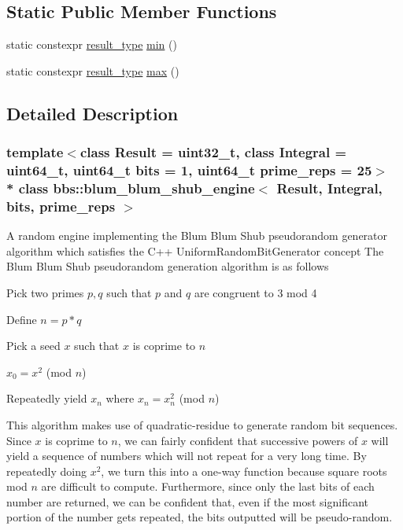 \subsection*{Static Public Member Functions}
\begin{DoxyCompactItemize}
\item 
static constexpr \hyperlink{classbbs_1_1blum__blum__shub__engine_af8f60205a8a8b5cee055ed54d5739805}{result\+\_\+type} \hyperlink{classbbs_1_1blum__blum__shub__engine_a4c76e93e841646e0f57919b7e6d759f4}{min} ()
\item 
static constexpr \hyperlink{classbbs_1_1blum__blum__shub__engine_af8f60205a8a8b5cee055ed54d5739805}{result\+\_\+type} \hyperlink{classbbs_1_1blum__blum__shub__engine_ab150bc100f30d32a7b64ca0834eaa0d9}{max} ()
\end{DoxyCompactItemize}


\subsection{Detailed Description}
\subsubsection*{template$<$class Result = uint32\+\_\+t, class Integral = uint64\+\_\+t, uint64\+\_\+t bits = 1, uint64\+\_\+t prime\+\_\+reps = 25$>$\\*
class bbs\+::blum\+\_\+blum\+\_\+shub\+\_\+engine$<$ Result, Integral, bits, prime\+\_\+reps $>$}

A random engine implementing the Blum Blum Shub pseudorandom generator algorithm which satisfies the C++ Uniform\+Random\+Bit\+Generator concept The Blum Blum Shub pseudorandom generation algorithm is as follows
\begin{DoxyEnumerate}
\item Pick two primes $ p, q $ such that $ p $ and $ q $ are congruent to 3 mod 4
\item Define $ n = p * q $
\item Pick a seed $ x $ such that $ x $ is coprime to $ n $
\item $ x_0 = x^2$ (mod $ n $)
\item Repeatedly yield $ x_n $ where $ x_n = x_n^2 $ (mod $ n $) 
\end{DoxyEnumerate}

This algorithm makes use of quadratic-\/residue to generate random bit sequences. Since $ x $ is coprime to $ n $, we can fairly confident that successive powers of $ x $ will yield a sequence of numbers which will not repeat for a very long time. By repeatedly doing $ x^2 $, we turn this into a one-\/way function because square roots mod $ n $ are difficult to compute. Furthermore, since only the last bits of each number are returned, we can be confident that, even if the most significant portion of the number gets repeated, the bits outputted will be pseudo-\/random.

